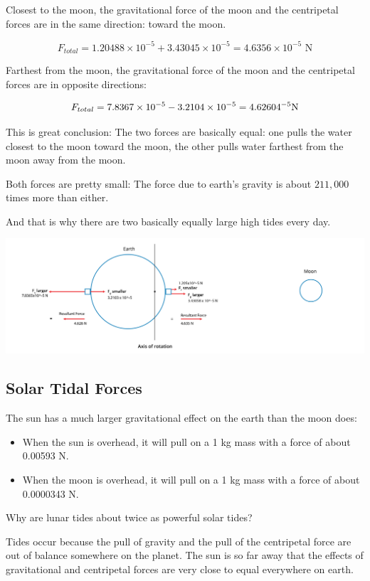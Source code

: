 \begin{Answer}[ref=life-orbits6]

Closest to the moon,   the gravitational force of the moon and the centripetal forces are in the same direction: toward the moon.

$$F_{total} = 1.20488 \times 10^{-5} + 3.43045 \times 10^{-5} = 4.6356 \times 10^{-5} \text{ N}$$

Farthest from the moon,  the gravitational force of the moon and the centripetal forces are in opposite directions:

$$F_{total} = 7.8367 \times 10^{-5} - 3.2104 \times 10^{-5} = 4.62604 \time 10^{-5} \text{N}$$

This is great conclusion:  The two forces are basically equal: one pulls the water closest to the moon toward the moon,  the other pulls water farthest from the moon away from the moon.

Both forces are pretty small:  The force due to earth's gravity is about $211,000$ times more than either.

And that is why there are two basically equally large high tides every day.

\includegraphics[width=.5\textwidth]{tidesSolution.png}

\end{Answer}


\subsection{Solar Tidal Forces}

The sun has a much larger gravitational effect on the earth than the moon does:
\begin{itemize}
\item When the sun is overhead,  it will pull on a 1 kg mass with a force of about 0.00593 N.
\item When the moon is overhead,  it will pull on a 1 kg mass with a force of about 0.0000343 N.
\end{itemize}

Why are lunar tides about twice as powerful solar tides?

Tides occur because the pull of gravity and the pull of the centripetal force are out of balance somewhere on the planet.  The sun is so far away that the effects of gravitational and centripetal forces are very close to equal everywhere on earth.





